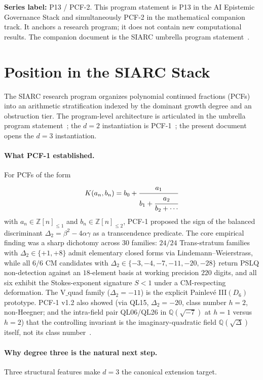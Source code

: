 \documentclass[11pt,a4paper]{article}
\theoremstyle{definition}
\theoremstyle{remark}
\newcommand{\Q}{\mathbb{Q}}
\newcommand{\Z}{\mathbb{Z}}
\begin{document}
\noindent\textbf{Series label:} P13 / PCF-2.\;
This program statement is P13 in the AI Epistemic Governance Stack and
simultaneously PCF-2 in the mathematical companion track. It anchors a
research program; it does not contain new computational results. The
companion document is the SIARC umbrella program
statement~\cite{Papanokechi2026UMB}.

\tableofcontents

\section{Position in the SIARC Stack}\label{sec:position}

The SIARC research program organizes polynomial continued fractions (PCFs)
into an arithmetic stratification indexed by the dominant growth degree
and an obstruction tier. The program-level architecture is articulated in
the umbrella program statement~\cite{Papanokechi2026UMB}; the
$d=2$ instantiation is PCF-1~\cite{Papanokechi2026PCF1}; the present
document opens the $d=3$ instantiation.

\paragraph{What PCF-1 established.}
For PCFs of the form
\[
K(a_{n},b_{n})=b_{0}+\cfrac{a_{1}}{b_{1}+\cfrac{a_{2}}{b_{2}+\cdots}}
\]
with $a_{n}\in\Z[n]_{\le 1}$ and $b_{n}\in\Z[n]_{\le 2}$, PCF-1
proposed the sign of the balanced discriminant
$\Delta_{2}=\beta^{2}-4\alpha\gamma$ as a transcendence predicate. The
core empirical finding was a sharp dichotomy across $30$ families: $24/24$
Trans-stratum families with $\Delta_{2}\in\{+1,+8\}$ admit elementary
closed forms via Lindemann--Weierstrass, while all $6/6$ CM candidates
with $\Delta_{2}\in\{-3,-4,-7,-11,-20,-28\}$ return PSLQ non-detection
against an $18$-element basis at working precision $220$ digits, and all
six exhibit the Stokes-exponent signature $S<1$ under a CM-respecting
deformation. The V$\_$quad family ($\Delta_{2}=-11$) is the explicit
Painlev\'e III$(D_{6})$ prototype. PCF-1 v1.2 also showed (via QL15,
$\Delta_{2}=-20$, class number $h=2$, non-Heegner; and the intra-field
pair QL06/QL26 in $\Q(\sqrt{-7})$ at $h=1$ versus $h=2$) that the
controlling invariant is the imaginary-quadratic field $\Q(\sqrt{\Delta})$
itself, not its class number~\cite{Papanokechi2026PCF1}.

\paragraph{Why degree three is the natural next step.}
Three structural features make $d=3$ the canonical extension target.
\end{document}
